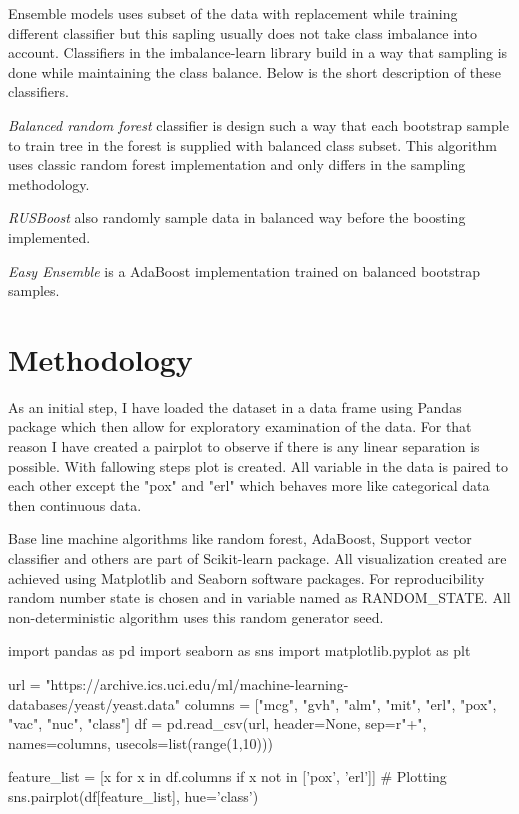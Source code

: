 \documentclass[12pt]{article}
\begin{document}
Ensemble models uses subset of the data with replacement while training different classifier but this sapling usually does not take class imbalance into account. Classifiers in the imbalance-learn library build in a way that sampling is done while maintaining the class balance. Below is the short description of these classifiers.

\textit{Balanced random forest} \cite{rforestbalanced} classifier is design such a way that each bootstrap sample to train tree in the forest is supplied with balanced class subset.
This algorithm uses classic random forest \cite{randomforest} implementation and only differs in the sampling methodology.


\textit{RUSBoost} \cite{rusboost} also randomly sample data in balanced way before the boosting implemented.

\textit{Easy Ensemble} \cite{adaboostbalance} is a AdaBoost \cite{adaboost} implementation trained on balanced bootstrap samples.

\section{Methodology} \label{sec:method}
As an initial step, I have loaded the dataset in a data frame using Pandas \cite{pandas} package which then allow for exploratory examination of the data. For that reason I have created a pairplot to observe if there is any linear separation is possible. With fallowing steps plot is created. All variable in the data is paired to each other except the "pox" and "erl" which behaves more like categorical data then continuous data.

Base line machine algorithms like random forest, AdaBoost, Support vector classifier and others are part of Scikit-learn \cite{scikit-learn} package. All visualization created are achieved using Matplotlib \cite{matplotlib} and Seaborn \cite{seaborn} software packages. For reproducibility random number state is chosen and in variable named as RANDOM\_STATE. All non-deterministic algorithm uses this random generator seed.

\begin{python}
import pandas as pd
import seaborn as sns
import matplotlib.pyplot as plt

url = "https://archive.ics.uci.edu/ml/machine-learning-databases/yeast/yeast.data"
columns = ["mcg", "gvh", "alm", "mit", "erl", "pox", "vac", "nuc", "class"]
df = pd.read_csv(url, header=None, sep=r"\s+", names=columns, usecols=list(range(1,10)))

feature_list = [x for x in df.columns if x not in ['pox', 'erl']]
# Plotting
sns.pairplot(df[feature_list], hue='class')
\end{python}
\end{document}
